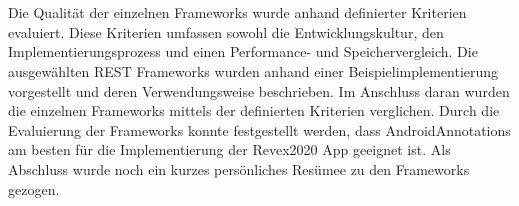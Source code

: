 \\\\
Die Qualität der einzelnen Frameworks wurde anhand definierter Kriterien evaluiert. Diese Kriterien umfassen sowohl die Entwicklungskultur, den Implementierungsprozess und einen Performance- und Speichervergleich. Die ausgewählten REST Frameworks wurden anhand einer Beispielimplementierung vorgestellt und deren Verwendungsweise beschrieben. Im Anschluss daran wurden die einzelnen Frameworks mittels der definierten Kriterien verglichen. Durch die Evaluierung der Frameworks konnte festgestellt werden, dass AndroidAnnotations am besten für die Implementierung der Revex2020 App geeignet ist. Als Abschluss wurde noch ein kurzes persönliches Resümee zu den Frameworks gezogen.